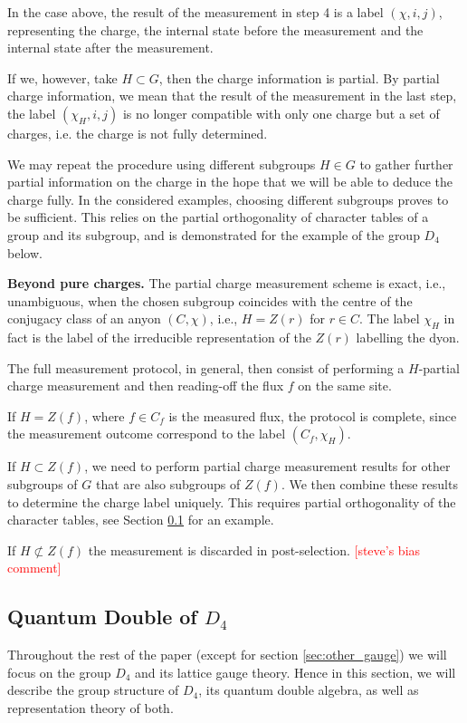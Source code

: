 \documentclass[two column]{article}
\newcommand{\caro}[1]{\textcolor{red}{[#1]}}
\begin{document}
In the case above, the result of the measurement in step 4 is a label $(\chi, i, j)$, representing the charge, the internal state before the measurement and the internal state after the measurement.

If we, however, take $H \subset G$, then the charge information is partial.
By partial charge information, we mean that the result of the measurement in the last step, the label $(\chi_H, i, j)$ is no longer compatible with only one charge but a set of charges, i.e. the charge is not fully determined.

We may repeat the procedure using different subgroups $H \in G$ to gather further partial information on the charge in the hope that we will be able to deduce the charge fully. In the considered examples, choosing different subgroups proves to be sufficient. This relies on the partial orthogonality of character tables of a group and its subgroup, and is demonstrated for the example of the group $D_4$ below.

\textbf{Beyond pure charges.} The partial charge measurement scheme is exact, i.e., unambiguous, when the chosen subgroup coincides with the centre of the conjugacy class of an anyon $(C, \chi)$, i.e., $H = Z(r)$ for $r \in C$.
The label $\chi_H$ in fact is the label of the irreducible representation of the $Z(r)$ labelling the dyon.

The full measurement protocol, in general, then consist of performing a $H$-partial charge measurement and then reading-off the flux $f$ on the same site. 

If $H = Z(f)$, where $f \in C_f$ is the measured flux, the protocol is complete, since the measurement outcome correspond to the label $(C_f, \chi_H)$.

If $H \subset Z(f)$, we need to perform partial charge measurement results for other subgroups of $G$ that are also subgroups of $Z(f)$. We then combine these results to determine the charge label uniquely. This requires partial orthogonality of the character tables, see Section \ref{sec:D4_double} for an example.

If $H \not\subset Z(f)$ the measurement is discarded in post-selection.
\caro{steve's bias comment}

\subsection{Quantum Double of $D_4$}\label{sec:D4_double}

Throughout the rest of the paper (except for section \ref{sec:other_gauge}) we will focus on the group $D_4$ and its lattice gauge theory.
Hence in this section, we will describe the group structure of $D_4$, its quantum double algebra, as well as representation theory of both.
\end{document}

